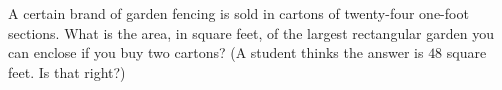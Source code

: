 A certain brand of garden fencing is sold in cartons of twenty-four one-foot sections. What is the area, in square feet, of the largest rectangular garden you can enclose if you buy two cartons? (A student thinks the answer is $48$ square feet. Is that right?)
